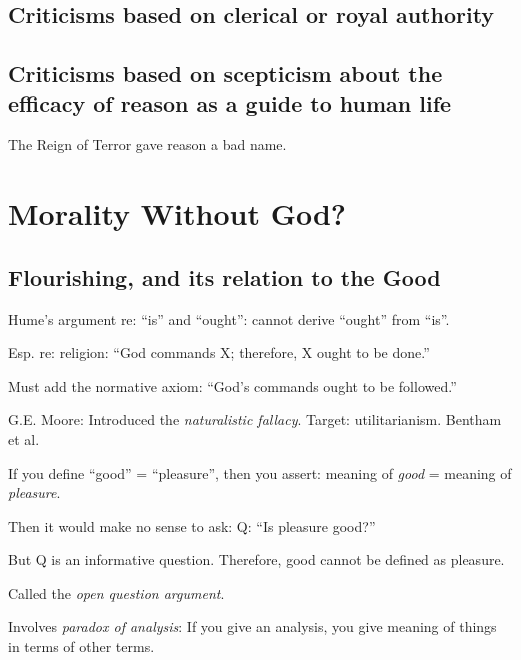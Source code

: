 \documentclass[
]{book}
\begin{document}
\hypertarget{criticisms-based-on-clerical-or-royal-authority}{%
\section{Criticisms based on clerical or royal authority}\label{criticisms-based-on-clerical-or-royal-authority}}

\hypertarget{criticisms-based-on-scepticism-about-the-efficacy-of-reason-as-a-guide-to-human-life}{%
\section{Criticisms based on scepticism about the efficacy of reason as a guide to human life}\label{criticisms-based-on-scepticism-about-the-efficacy-of-reason-as-a-guide-to-human-life}}

The Reign of Terror gave reason a bad name.

\hypertarget{morality-without-god}{%
\chapter{Morality Without God?}\label{morality-without-god}}

\hypertarget{flourishing-and-its-relation-to-the-good}{%
\section{Flourishing, and its relation to the Good}\label{flourishing-and-its-relation-to-the-good}}

Hume's argument re: ``is'' and ``ought'': cannot derive ``ought'' from ``is''.

Esp. re: religion: ``God commands X; therefore, X ought to be done.''

Must add the normative axiom: ``God's commands ought to be followed.''

G.E. Moore: Introduced the \emph{naturalistic fallacy}.
Target: utilitarianism. Bentham et al.

If you define ``good'' = ``pleasure'', then you assert: meaning of \emph{good} = meaning of \emph{pleasure}.

Then it would make no sense to ask:
Q: ``Is pleasure good?''

But Q is an informative question.
Therefore, good cannot be defined as pleasure.

Called the \emph{open question argument}.

Involves \emph{paradox of analysis}: If you give an analysis, you give meaning of things in terms of other terms.
\end{document}
